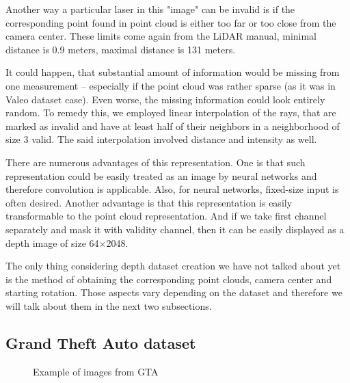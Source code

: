 Another way a particular laser in this "image" can be invalid is if the corresponding point found in point cloud is either too far or too close from the camera center. These limits come again from the LiDAR manual, minimal distance is 0.9 meters, maximal distance is 131 meters.

It could happen, that substantial amount of information would be missing from one measurement -- especially if the point cloud was rather sparse (as it was in Valeo dataset case). Even worse, the missing information could look entirely random. To remedy this, we employed linear interpolation of the rays, that are marked as invalid and have at least half of their neighbors in a neighborhood of size 3 valid. The said interpolation involved distance and intensity as well.

There are numerous advantages of this representation. One is that such representation could be easily treated as an image by neural networks and therefore convolution is applicable. Also, for neural networks, fixed-size input is often desired. Another advantage is that this representation is easily transformable to the point cloud representation. And if we take first channel separately and mask it with validity channel, then it can be easily displayed as a depth image of size 64$\times$2048.

The only thing considering depth dataset creation we have not talked about yet is the method of obtaining the corresponding point clouds, camera center and starting rotation. Those aspects vary depending on the dataset and therefore we will talk about them in the next two subsections.

\subsection{Grand Theft Auto dataset}

\begin{figure}
\centering
{}
\hfil
{}
\caption{Example of images from GTA}
\end{figure}

